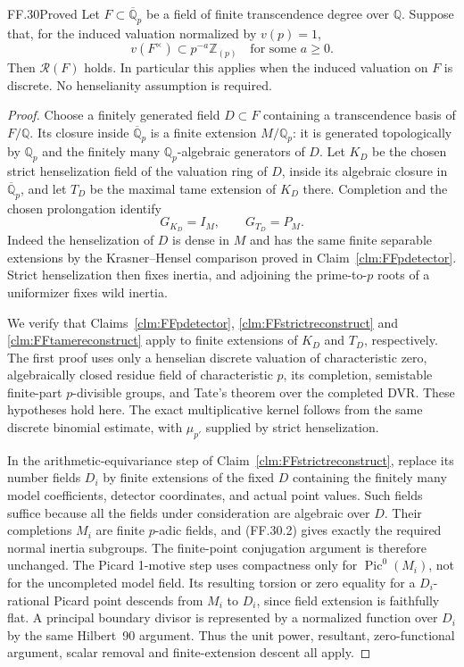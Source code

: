 \begin{claim}{FF.30}{Proved}\label{clm:FFpadicsubfields}
Let \(F\subset\overline{\mathbb Q}_p\) be a field
of finite transcendence degree over \(\mathbb Q\).
Suppose that, for the induced valuation normalized
by \(v(p)=1\),
\[
                  v(F^\times)\subset
                         p^{-a}\mathbb Z_{(p)}
                    \quad\text{for some }a\geq0.       \tag{FF.30.1}
\]
Then \(\mathcal R(F)\) holds. In particular this
applies when the induced valuation on \(F\) is
discrete. No henselianity assumption is required.
\end{claim}
\begin{proof}
Choose a finitely generated field
\(D\subset F\) containing a transcendence basis
of \(F/\mathbb Q\). Its closure inside
\(\overline{\mathbb Q}_p\) is a finite extension
\(M/\mathbb Q_p\): it is generated topologically
by \(\mathbb Q_p\) and the finitely many
\(\mathbb Q_p\)-algebraic generators of \(D\).
Let \(K_D\) be the chosen strict henselization
field of the valuation ring of \(D\), inside
its algebraic closure in
\(\overline{\mathbb Q}_p\), and let
\(T_D\) be the maximal tame extension of \(K_D\)
there. Completion and the chosen prolongation
identify
\[
               G_{K_D}=I_M,\qquad G_{T_D}=P_M.         \tag{FF.30.2}
\]
Indeed the henselization of \(D\) is dense in
\(M\) and has the same finite separable extensions
by the Krasner--Hensel comparison proved in
Claim~\ref{clm:FFpdetector}. Strict henselization
then fixes inertia, and adjoining the prime-to-\(p\)
roots of a uniformizer fixes wild inertia.

We verify that Claims~\ref{clm:FFpdetector},
\ref{clm:FFstrictreconstruct} and
\ref{clm:FFtamereconstruct} apply to finite
extensions of \(K_D\) and \(T_D\), respectively.
The first proof uses only a henselian discrete
valuation of characteristic zero, algebraically
closed residue field of characteristic \(p\),
its completion, semistable finite-part
\(p\)-divisible groups, and Tate's theorem over
the completed DVR. These hypotheses hold here.
The exact multiplicative kernel follows from
the same discrete binomial estimate, with
\(\mu_{p'}\) supplied by strict henselization.

In the arithmetic-equivariance step of
Claim~\ref{clm:FFstrictreconstruct}, replace
its number fields \(D_i\) by finite extensions
of the fixed \(D\) containing the finitely
many model coefficients, detector coordinates,
and actual point values. Such fields suffice
because all the fields under consideration are
algebraic over \(D\). Their completions
\(M_i\) are finite \(p\)-adic fields, and
(FF.30.2) gives exactly the required normal
inertia subgroups. The finite-point conjugation
argument is therefore unchanged. The Picard
1-motive step uses compactness only for
\(\operatorname{Pic}^0(M_i)\), not for the
uncompleted model field. Its resulting torsion
or zero equality for a \(D_i\)-rational Picard
point descends from \(M_i\) to \(D_i\), since
field extension is faithfully flat. A principal
boundary divisor is represented by a normalized
function over \(D_i\) by the same Hilbert~90
argument. Thus the unit power, resultant,
zero-functional argument, scalar removal and
finite-extension descent all apply.


\end{proof}
